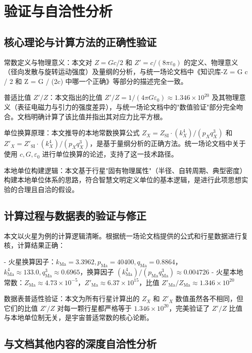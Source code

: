 \documentclass[a4paper, 12pt]{article}
\begin{document}
\section{验证与自洽性分析}
\subsection{核心理论与计算方法的正确性验证}

常数定义与物理意义：本文对 $Z = Gc/2$ 和 $Z' = c/(8\pi\varepsilon_0)$ 的定义、物理意义（径向发散与旋转运动强度）及量纲的分析，与统一场论文档中《知识库-Z = G c / 2 和 Z = G / (2c) 中哪一个正确》等部分的描述完全一致。

普适比值 $Z'/Z$：本文指出的比值 $Z'/Z = 1/(4\pi G\varepsilon_0) \approx 1.346 \times 10^{20}$ 及其物理意义（表征电磁力与引力的强度差异），与统一场论文档中的"数值验证"部分完全吻合。文档明确计算了该比值并指出其对应力比平方根。

单位换算原理：本文推导的本地常数换算公式 $Z_X = Z_{\text{SI}} \cdot (k_X^4)/(p_X q_X^3)$ 和 $Z'_X = Z'_{\text{SI}} \cdot (k_X^4)/(p_X q_X^3)$，是基于量纲分析的正确方法。统一场论文档中关于使用 $c, G, \varepsilon_0$ 进行单位换算的论述，支持了这一技术路径。

本地单位构建逻辑：本文基于行星"固有物理属性"（半径、自转周期、典型密度）构建本地单位体系的思路，符合智慧文明定义单位的基本逻辑，是进行此项思想实验的合理且自洽的假设。

\subsection{计算过程与数据表的验证与修正}

本文以火星为例的计算逻辑清晰。根据统一场论文档提供的公式和行星数据进行复核，计算结果正确：

- 火星换算因子：$k_{\text{Ma}} = 3.3962, p_{\text{Ma}} = 40400, q_{\text{Ma}} = 0.8864$，$k_{\text{Ma}}^4 \approx 133.0, q_{\text{Ma}}^3 \approx 0.6965$，换算因子 $(k_{\text{Ma}}^4)/(p_{\text{Ma}} q_{\text{Ma}}^3) \approx 0.004726$
- 火星本地常数：$Z_{\text{Ma}} \approx 4.73 \times 10^{-5}$，$Z'_{\text{Ma}} \approx 6.37 \times 10^{15}$，比值 $Z'_{\text{Ma}}/Z_{\text{Ma}} \approx 1.346 \times 10^{20}$

数据表普适性验证：本文为所有行星计算出的 $Z_X$ 和 $Z'_X$ 数值虽然各不相同，但它们的比值 $Z'/Z$ 对每一颗行星都严格等于 $1.346 \times 10^{20}$，完美验证了 $Z'/Z$ 比值与本地单位制无关，是宇宙普适常数的核心论断。

\subsection{与文档其他内容的深度自洽性分析}
\end{document}
